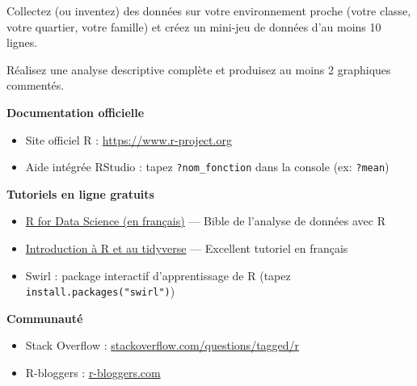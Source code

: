 \documentclass[
  french,
  11pt,
  a4paper,
]{article}
\providecommand{\tightlist}{%
  \setlength{\itemsep}{0pt}\setlength{\parskip}{0pt}}
\begin{document}
\begin{tcolorbox}[enhanced jigsaw, arc=.35mm, bottomrule=.15mm, bottomtitle=1mm, breakable, colback=white, colbacktitle=quarto-callout-caution-color!10!white, colframe=quarto-callout-caution-color-frame, coltitle=black, left=2mm, leftrule=.75mm, opacityback=0, opacitybacktitle=0.6, rightrule=.15mm, title=\textcolor{quarto-callout-caution-color}{\faFire}\hspace{0.5em}{Devoir à rendre --- Exercice B : Exploration}, titlerule=0mm, toprule=.15mm, toptitle=1mm]

Collectez (ou inventez) des données sur votre environnement proche
(votre classe, votre quartier, votre famille) et créez un mini-jeu de
données d'au moins 10 lignes.

Réalisez une analyse descriptive complète et produisez au moins 2
graphiques commentés.

\end{tcolorbox}

\begin{tcolorbox}[enhanced jigsaw, arc=.35mm, bottomrule=.15mm, bottomtitle=1mm, breakable, colback=white, colbacktitle=quarto-callout-tip-color!10!white, colframe=quarto-callout-tip-color-frame, coltitle=black, left=2mm, leftrule=.75mm, opacityback=0, opacitybacktitle=0.6, rightrule=.15mm, title=\textcolor{quarto-callout-tip-color}{\faLightbulb}\hspace{0.5em}{Ressources pour aller plus loin}, titlerule=0mm, toprule=.15mm, toptitle=1mm]

\textbf{Documentation officielle}

\begin{itemize}
\tightlist
\item
  Site officiel R : \url{https://www.r-project.org}
\item
  Aide intégrée RStudio : tapez \texttt{?nom\_fonction} dans la console
  (ex: \texttt{?mean})
\end{itemize}

\textbf{Tutoriels en ligne gratuits}

\begin{itemize}
\tightlist
\item
  \href{https://r4ds.hadley.nz}{R for Data Science (en français)} ---
  Bible de l'analyse de données avec R
\item
  \href{https://juba.github.io/tidyverse/}{Introduction à R et au
  tidyverse} --- Excellent tutoriel en français
\item
  Swirl : package interactif d'apprentissage de R (tapez
  \texttt{install.packages("swirl")})
\end{itemize}

\textbf{Communauté}

\begin{itemize}
\tightlist
\item
  Stack Overflow :
  \href{https://stackoverflow.com/questions/tagged/r}{stackoverflow.com/questions/tagged/r}
\item
  R-bloggers : \href{https://www.r-bloggers.com}{r-bloggers.com}
\end{itemize}

\end{tcolorbox}
\end{document}

